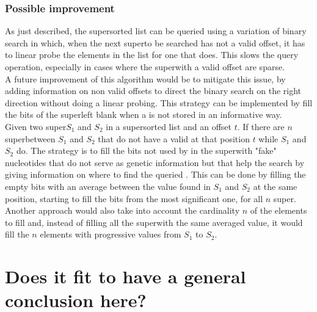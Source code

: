 \subsubsection{Possible improvement}
As just described, the super\kmer sorted list can be queried using a variation of binary search in which, when the next super\kmer to be searched has not a valid offset, it has to linear probe the elements in the list for one that does. This slows the query operation, especially in cases where the super\kmers with a valid offset are sparse. \\
A future improvement of this algorithm would be to mitigate this issue, by adding information on non valid offsets to direct the binary search on the right direction without doing a linear probing. This strategy can be implemented by fill the bits of the super\kmer left blank when a \kmer is not stored in an informative way.\\
Given two super\kmers $S_1$ and $S_2$ in a super\kmer sorted list and an offset $t$. If there are $n$ super\kmers between $S_1$ and $S_2$ that do not have a valid \kmer at that position $t$ while $S_1$ and $S_2$ do. The strategy is to fill the bits not used by \kmers in the super\kmer with "fake" nucleotides that do not serve as genetic information but that help the search by giving information on where to find the queried \kmer. This can be done by filling the empty bits with an average between the value found in $S_1$ and $S_2$ at the same position, starting to fill the bits from the most significant one, for all $n$ super\kmers. Another approach would also take into account the cardinality $n$ of the elements to fill and, instead of filling all the super\kmers with the same averaged value, it would fill the $n$ elements with progressive values from $S_1$ to $S_2$.

\section{Does it fit to have a general conclusion here?}

